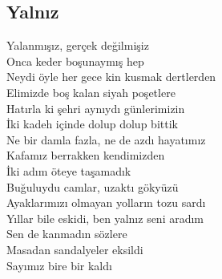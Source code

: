 \subsection{Yalnız}

Yalanmışız, gerçek değilmişiz \\
Onca keder boşunaymış hep \\
Neydi öyle her gece kin kusmak dertlerden \\
Elimizde boş kalan siyah poşetlere \\
Hatırla ki şehri aynıydı günlerimizin \\
İki kadeh içinde dolup dolup bittik \\
Ne bir damla fazla, ne de azdı hayatımız \\
Kafamız berrakken kendimizden \\
İki adım öteye taşamadık \\
Buğuluydu camlar, uzaktı gökyüzü \\
Ayaklarımızı olmayan yolların tozu sardı \\
Yıllar bile eskidi, ben yalnız seni aradım \\
Sen de kanmadın sözlere \\
Masadan sandalyeler eksildi \\
Sayımız bire bir kaldı
